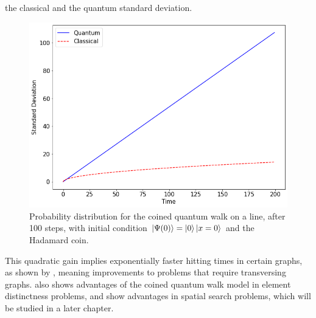 \documentclass[../../dissertation.tex]{subfiles}
\begin{document}
the classical and the quantum standard deviation.
\begin{figure}[!h]
	\centering
	\includegraphics[scale=0.40]{img/CoinedQuantumWalk/coinedClassicalStdDev.png}
	\caption{Probability distribution for the coined quantum walk on a line, after 100 steps, with initial condition $\ket{\Psi(0)}=\ket{0}\ket{x=0}$ and the Hadamard coin.} 
	\label{fig:coinedClassicalStdDev}
\end{figure}\par
This quadratic gain implies exponentially faster hitting times in certain
graphs, as shown by \cite{childs2002}, meaning improvements to problems that
require transversing graphs. \cite{ambainis2003} also shows advantages of the
coined quantum walk model in element distinctness problems, and
\cite{childs2004} show advantages in spatial search problems, which will be
studied in a later chapter.\par
\end{document}
